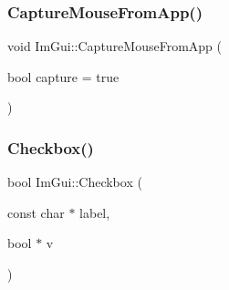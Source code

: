 \subsubsection{\texorpdfstring{Capture\+Mouse\+From\+App()}{CaptureMouseFromApp()}}
{\footnotesize\ttfamily void Im\+Gui\+::\+Capture\+Mouse\+From\+App (\begin{DoxyParamCaption}\item[{bool}]{capture = {\ttfamily true} }\end{DoxyParamCaption})}

\mbox{\label{namespace_im_gui_a57d73c1d0ef807fef734d91024092027}} 
\subsubsection{\texorpdfstring{Checkbox()}{Checkbox()}}
{\footnotesize\ttfamily bool Im\+Gui\+::\+Checkbox (\begin{DoxyParamCaption}\item[{const char $\ast$}]{label,  }\item[{bool $\ast$}]{v }\end{DoxyParamCaption})}

